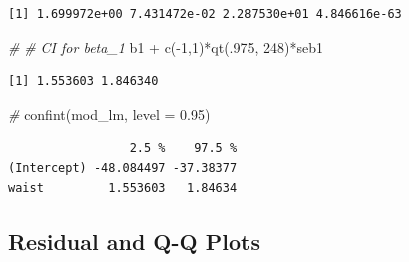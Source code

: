 \documentclass[
]{article}
\newenvironment{Shaded}{\begin{snugshade}}{\end{snugshade}}
\newcommand{\AttributeTok}[1]{\textcolor[rgb]{0.77,0.63,0.00}{#1}}
\newcommand{\CommentTok}[1]{\textcolor[rgb]{0.56,0.35,0.01}{\textit{#1}}}
\newcommand{\ConstantTok}[1]{\textcolor[rgb]{0.00,0.00,0.00}{#1}}
\newcommand{\DecValTok}[1]{\textcolor[rgb]{0.00,0.00,0.81}{#1}}
\newcommand{\FloatTok}[1]{\textcolor[rgb]{0.00,0.00,0.81}{#1}}
\newcommand{\FunctionTok}[1]{\textcolor[rgb]{0.00,0.00,0.00}{#1}}
\newcommand{\NormalTok}[1]{#1}
\newcommand{\OtherTok}[1]{\textcolor[rgb]{0.56,0.35,0.01}{#1}}
\newcommand{\SpecialCharTok}[1]{\textcolor[rgb]{0.00,0.00,0.00}{#1}}
\begin{document}
\begin{Shaded}
\end{Shaded}

\begin{verbatim}
[1] 1.699972e+00 7.431472e-02 2.287530e+01 4.846616e-63
\end{verbatim}

\begin{Shaded}
\begin{Highlighting}[]
\CommentTok{\#}
\CommentTok{\# CI for beta\_1}
\NormalTok{b1 }\SpecialCharTok{+} \FunctionTok{c}\NormalTok{(}\SpecialCharTok{{-}}\DecValTok{1}\NormalTok{,}\DecValTok{1}\NormalTok{)}\SpecialCharTok{*}\FunctionTok{qt}\NormalTok{(.}\DecValTok{975}\NormalTok{, }\DecValTok{248}\NormalTok{)}\SpecialCharTok{*}\NormalTok{seb1}
\end{Highlighting}
\end{Shaded}

\begin{verbatim}
[1] 1.553603 1.846340
\end{verbatim}

\begin{Shaded}
\begin{Highlighting}[]
\CommentTok{\#}
\FunctionTok{confint}\NormalTok{(mod\_lm, }\AttributeTok{level =} \FloatTok{0.95}\NormalTok{)}
\end{Highlighting}
\end{Shaded}

\begin{verbatim}
                 2.5 %    97.5 %
(Intercept) -48.084497 -37.38377
waist         1.553603   1.84634
\end{verbatim}

\hypertarget{residual-and-q-q-plots}{%
\subsection{Residual and Q-Q Plots}\label{residual-and-q-q-plots}}
\end{document}

